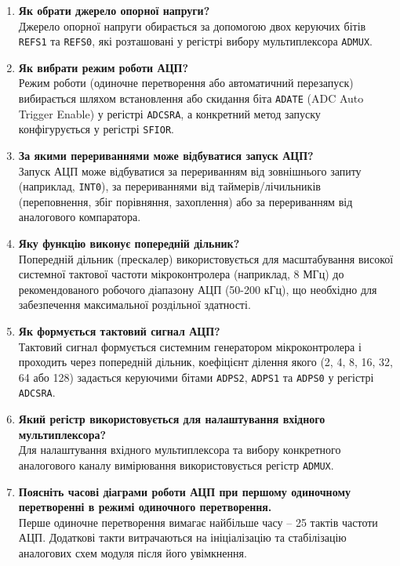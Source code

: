 \documentclass[14pt, a4paper]{extreport}
\begin{document}
\begin{enumerate}
		\item \textbf{Як обрати джерело опорної напруги?} \\ Джерело опорної напруги обирається за допомогою двох керуючих бітів \texttt{REFS1} та \texttt{REFS0}, які розташовані у регістрі вибору мультиплексора \texttt{ADMUX}.
		
		\item \textbf{Як вибрати режим роботи АЦП?} \\ Режим роботи (одиночне перетворення або автоматичний перезапуск) вибирається шляхом встановлення або скидання біта \texttt{ADATE} (ADC Auto Trigger Enable) у регістрі \texttt{ADCSRA}, а конкретний метод запуску конфігурується у регістрі \texttt{SFIOR}.
		
		\item \textbf{За якими перериваннями може відбуватися запуск АЦП?} \\ Запуск АЦП може відбуватися за перериванням від зовнішнього запиту (наприклад, \texttt{INT0}), за перериваннями від таймерів/лічильників (переповнення, збіг порівняння, захоплення) або за перериванням від аналогового компаратора.
		
		\item \textbf{Яку функцію виконує попередній дільник?} \\ Попередній дільник (прескалер) використовується для масштабування високої системної тактової частоти мікроконтролера (наприклад, 8 МГц) до рекомендованого робочого діапазону АЦП (50-200 кГц), що необхідно для забезпечення максимальної роздільної здатності.
		
		\item \textbf{Як формується тактовий сигнал АЦП?} \\ Тактовий сигнал формується системним генератором мікроконтролера і проходить через попередній дільник, коефіцієнт ділення якого (2, 4, 8, 16, 32, 64 або 128) задається керуючими бітами \texttt{ADPS2}, \texttt{ADPS1} та \texttt{ADPS0} у регістрі \texttt{ADCSRA}.
		
		\item \textbf{Який регістр використовується для налаштування вхідного мультиплексора?} \\ Для налаштування вхідного мультиплексора та вибору конкретного аналогового каналу вимірювання використовується регістр \texttt{ADMUX}.
		
		\item \textbf{Поясніть часові діаграми роботи АЦП при першому одиночному перетворенні в режимі одиночного перетворення.} \\ Перше одиночне перетворення вимагає найбільше часу -- 25 тактів частоти АЦП. Додаткові такти витрачаються на ініціалізацію та стабілізацію аналогових схем модуля після його увімкнення.
		

\end{enumerate}
\end{document}
